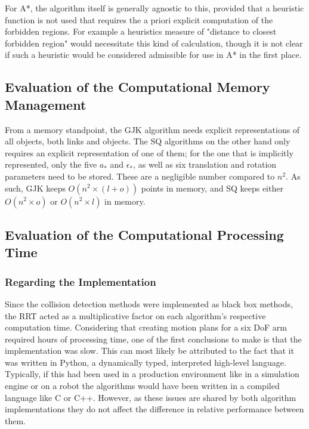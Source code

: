 For A*, the algorithm itself is generally agnostic to this, provided that a heuristic function is not used that requires the a priori explicit computation of the forbidden regions. For example a heuristics measure of "distance to closest forbidden region" would necessitate this kind of calculation, though it is not clear if such a heuristic would be considered admissible for use in A* in the first place. 

\subsection{Evaluation of the Computational Memory Management}

From a memory standpoint, the \gls{GJK} algorithm needs explicit representations of all objects, both links and objects. The \gls{SQ} algorithms on the other hand only requires an explicit representation of one of them; for the one that is implicitly represented, only the five $a_*$ and $\epsilon_*$, as well as six translation and rotation parameters need to be stored. These are a negligible number compared to $n^2$. As such, \gls{GJK} keeps $O(n^2 \times (l + o))$ points in memory, and \gls{SQ} keeps either $O(n^2 \times o)$ or $O(n^2 \times l)$ in memory.


\subsection{Evaluation of the Computational Processing Time}
 
\subsubsection{Regarding the Implementation}

Since the collision detection methods were implemented as black box methods, the \gls{RRT} acted as a multiplicative factor on each algorithm's respective computation time. Considering that creating motion plans for a six \gls{DoF} arm required hours of processing time, one of the first conclusions to make is that the implementation was slow. This can most likely be attributed to the fact that it was written in Python, a dynamically typed, interpreted high-level language. Typically, if this had been used in a production environment like in a simulation engine or on a robot the algorithms would have been written in a compiled language like C or C++. However, as these issues are shared by both algorithm implementations they do not affect the difference in relative performance between them.




